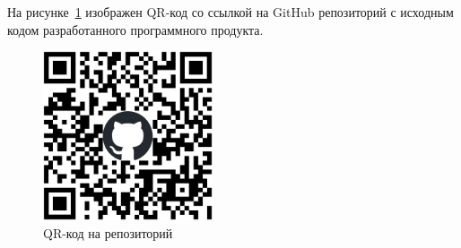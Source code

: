 
На рисунке~\ref{qr} изображен QR-код со ссылкой на GitHub репозиторий с исходным кодом разработанного программного продукта.

\begin{figure}
    \includegraphics[width=5cm]{../img/qr-git.eps}
    \caption{QR-код на репозиторий}
    \label{qr}
\end{figure}
